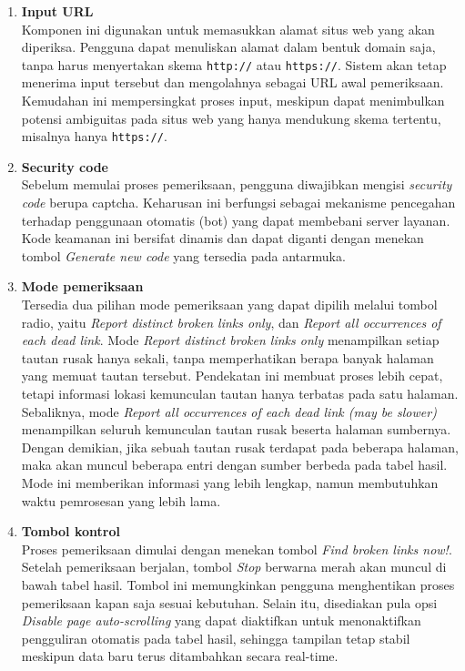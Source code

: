 \begin{enumerate}
    \item \textbf{Input URL}\\
    Komponen ini digunakan untuk memasukkan alamat situs web yang akan diperiksa. Pengguna dapat menuliskan alamat dalam bentuk domain saja, tanpa harus menyertakan skema \texttt{http://} atau \texttt{https://}. Sistem akan tetap menerima input tersebut dan mengolahnya sebagai URL awal pemeriksaan. Kemudahan ini mempersingkat proses input, meskipun dapat menimbulkan potensi ambiguitas pada situs web yang hanya mendukung skema tertentu, misalnya hanya \texttt{https://}.

    \item \textbf{Security code}\\
    Sebelum memulai proses pemeriksaan, pengguna diwajibkan mengisi \textit{security code} berupa captcha. Keharusan ini berfungsi sebagai mekanisme pencegahan terhadap penggunaan otomatis (bot) yang dapat membebani server layanan. Kode keamanan ini bersifat dinamis dan dapat diganti dengan menekan tombol \textit{Generate new code} yang tersedia pada antarmuka.

    \item \textbf{Mode pemeriksaan}\\
    Tersedia dua pilihan mode pemeriksaan yang dapat dipilih melalui tombol radio, yaitu \textit{Report distinct broken links only}, dan \textit{Report all occurrences of each dead link}. Mode \textit{Report distinct broken links only} menampilkan setiap tautan rusak hanya sekali, tanpa memperhatikan berapa banyak halaman yang memuat tautan tersebut. Pendekatan ini membuat proses lebih cepat, tetapi informasi lokasi kemunculan tautan hanya terbatas pada satu halaman. Sebaliknya, mode \textit{Report all occurrences of each dead link (may be slower)} menampilkan seluruh kemunculan tautan rusak beserta halaman sumbernya. Dengan demikian, jika sebuah tautan rusak terdapat pada beberapa halaman, maka akan muncul beberapa entri dengan sumber berbeda pada tabel hasil. Mode ini memberikan informasi yang lebih lengkap, namun membutuhkan waktu pemrosesan yang lebih lama.

    \item \textbf{Tombol kontrol}\\
    Proses pemeriksaan dimulai dengan menekan tombol \textit{Find broken links now!}. Setelah pemeriksaan berjalan, tombol \textit{Stop} berwarna merah akan muncul di bawah tabel hasil. Tombol ini memungkinkan pengguna menghentikan proses pemeriksaan kapan saja sesuai kebutuhan. Selain itu, disediakan pula opsi \textit{Disable page auto-scrolling} yang dapat diaktifkan untuk menonaktifkan pengguliran otomatis pada tabel hasil, sehingga tampilan tetap stabil meskipun data baru terus ditambahkan secara real-time.


\end{enumerate}
